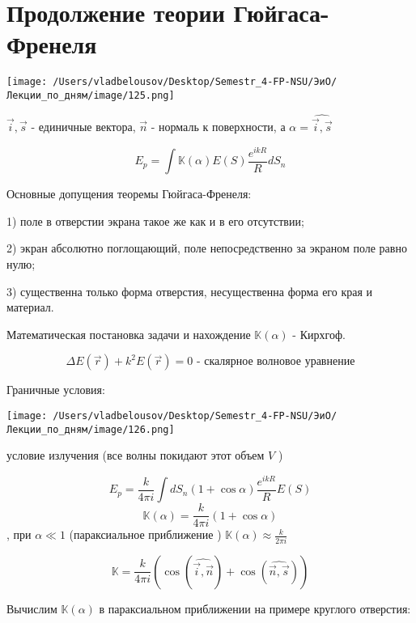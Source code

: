\documentclass[12pt, a4paper]{report}
\begin{document}
\fi


\section{Продолжение теории Гюйгаса-Френеля}

\begin{center}
    \texttt{[image: /Users/vladbelousov/Desktop/Semestr\_4-FP-NSU/ЭиО/Лекции\_по\_дням/image/125.png]}
\end{center}
\( \vec{i }  , \vec{s}  \) - единичные вектора, \( \vec{n }  \) - нормаль к поверхности, а  \( \alpha = \widehat{\vec{i},\vec{s}  }  \) 

\[ E_p = \int  \mathbb{K} (\alpha ) E (S ) \frac{e^{ i k R }  }{R } d S_n  \] 

Основные допущения теоремы Гюйгаса-Френеля: 

1) поле в отверстии экрана такое же как и в его отсутствии; 

2) экран абсолютно поглощающий, поле непосредственно за экраном поле равно нулю; 

3) существенна только форма отверстия, несущественна форма его края и материал.

Математическая постановка задачи и нахождение \( \mathbb{K}(\alpha ) \)  - Кирхгоф. 

\[ \Delta E (\vec{r }   ) + k ^2 E (\vec{r } ) = 0  \text{ - скалярное волновое уравнение}  \]

Граничные условия: 

\begin{center}
    \texttt{[image: /Users/vladbelousov/Desktop/Semestr\_4-FP-NSU/ЭиО/Лекции\_по\_дням/image/126.png]}
\end{center}
условие излучения (все волны покидают этот объем \( V \) )

\[ E_p = \frac{k}{4 \pi i } \int  d S_n (1 + \cos  \alpha ) \frac{e^{ i k R }        }{ R } E(S )   \] 
\[ \mathbb{K}    (\alpha ) = \frac{k}{4 \pi i } (1 + \cos  \alpha )   \] 
, при \( \alpha \ll 1  \) (параксиальное приближение ) \( \displaystyle  \mathbb{K}     (\alpha ) \approx \frac{k}{2 \pi i}  \) 

\[ \mathbb{K}   = \frac{k}{4 \pi i } \left( \cos ( \widehat{\vec{i } ,\vec{n} }) + \cos (\widehat{\vec{n } , \vec{s} }) \right)  \] 

Вычислим \( \mathbb{K}(\alpha) \) в параксиальном приближении на примере круглого отверстия: 
\end{document}
